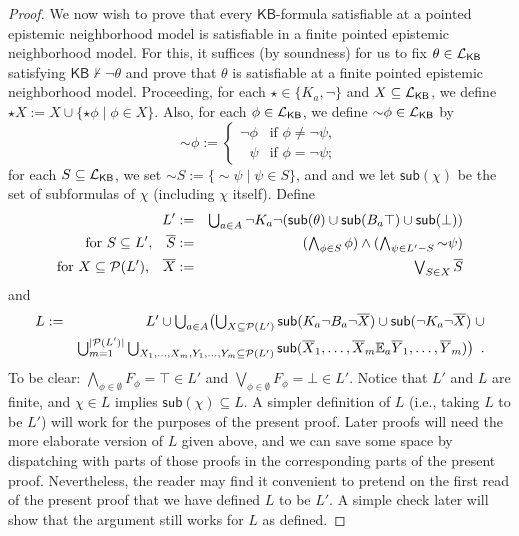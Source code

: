\documentclass[12pt]{article}
\theoremstyle{definition}
\newcommand{\pow}{{\cal P}}    %
\newcommand{\Lang}{{\cal L}}   %
\newcommand{\KB}{{\mathsf{KB}}}                     %
\begin{document}
\begin{proof}
  We now wish to prove that every $\KB$-formula satisfiable at a
  pointed epistemic neighborhood model is satisfiable in a finite
  pointed epistemic neighborhood model.  For this, it suffices (by
  soundness) for us to fix $\theta\in\Lang_\KB$ satisfying
  $\KB\nvdash\lnot\theta$ and prove that $\theta$ is satisfiable at a
  finite pointed epistemic neighborhood model.  Proceeding, for each
  $\star\in\{K_a,\lnot\}$ and $X\subseteq\Lang_\KB$, we define $\star
  X:=X\cup\{\star\phi\mid\phi\in X\}$.  Also, for each
  $\phi\in\Lang_\KB$, we define ${\sim}\phi\in\Lang_\KB$ by
  \[
  {\sim}\phi :=
  \begin{cases}
    \lnot\phi & \text{if } \phi\neq\lnot\psi, \\
    \phantom{\lnot}\psi & \text{if } \phi=\lnot\psi;
  \end{cases}
  \]
  for each $S\subseteq\Lang_\KB$, we set ${\sim}S:=\{{\sim}\psi\mid
  \psi\in S\}$, and and we let $\mathsf{sub}(\chi)$ be the set of
  subformulas of $\chi$ (including $\chi$ itself).  Define
  \begin{eqnarray*}
    L' &:=&
    \textstyle\bigcup_{a\in A}\lnot
    K_a\lnot(\mathsf{sub}(\theta)\cup
    \mathsf{sub}(B_a\top)\cup
    \mathsf{sub}(\bot))
    \\
    \text{for }S\subseteq L'\text{,}\quad
    \overline S &:=&
    \textstyle
    (\bigwedge_{\phi\in S}\phi)\land
    (\bigwedge_{\psi\in L'-S}{\sim}\psi)
    \\
    \text{for }X\subseteq\pow(L')\text{,}\quad
    \overline X &:=&
    \textstyle
    \bigvee_{S\in X}\overline S
  \end{eqnarray*}
  and
  \begin{eqnarray*}
    L &:=&
    \textstyle
    L' \cup \bigcup_{a\in A}\bigl(\bigcup_{X\subseteq\pow(L')}
    \mathsf{sub}(K_a\lnot B_a\lnot\overline X)\cup
    \mathsf{sub}(\lnot K_a\lnot\overline X)\;\cup
    \\
    &&
    \textstyle
    \bigcup_{m=1}^{|\pow(L')|}
    \bigcup_{X_1,\dots,X_m,Y_1,\dots,Y_m\subseteq\pow(L')}
    \mathsf{sub}(\overline X_1,\dots,\overline X_m\mathbb{E}_a
    \overline Y_1,\dots,\overline Y_m)\bigr)
    \enspace.
  \end{eqnarray*}
  To be clear: $\bigwedge_{\phi\in\emptyset}F_\phi=\top\in L'$ and
  $\bigvee_{\phi\in\emptyset}F_\phi=\bot\in L'$.  Notice that $L'$ and
  $L$ are finite, and $\chi\in L$ implies $\mathsf{sub}(\chi)\subseteq
  L$. A simpler definition of $L$ (i.e., taking $L$ to be $L'$) will
  work for the purposes of the present proof.  Later proofs will need
  the more elaborate version of $L$ given above, and we can save some
  space by dispatching with parts of those proofs in the corresponding
  parts of the present proof.  Nevertheless, the reader may find it
  convenient to pretend on the first read of the present proof that we
  have defined $L$ to be $L'$.  A simple check later will show that
  the argument still works for $L$ as defined.


\end{proof}
\end{document}
